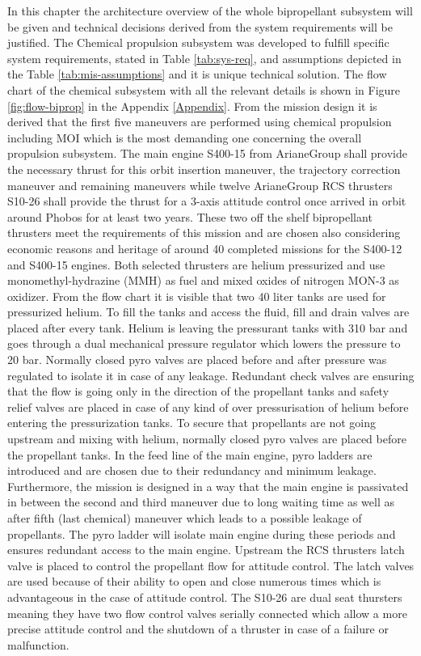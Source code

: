 \documentclass[conference]{IEEEtran}
\begin{document}
In this chapter the architecture overview of the whole bipropellant subsystem will be given and technical decisions derived from the system requirements will be justified.
The Chemical propulsion subsystem was developed to fulfill specific system requirements, stated in Table \ref{tab:sys-req}, and assumptions depicted in the Table \ref{tab:mis-assumptions} and it is unique technical solution. The flow chart of the chemical subsystem with all the relevant details is shown in Figure \ref{fig:flow-biprop} in the Appendix \ref{Appendix}. From the mission design it is derived that the first five maneuvers are performed using chemical propulsion including MOI which is the most demanding one concerning the overall propulsion subsystem. The main engine S400-15 from ArianeGroup shall provide the necessary thrust for this orbit insertion maneuver, the trajectory correction maneuver and remaining maneuvers while twelve ArianeGroup RCS thrusters S10-26 shall provide the thrust for a 3-axis attitude control once arrived in orbit around Phobos for at least two years. These two off the shelf bipropellant thrusters meet the requirements of this mission and are chosen also considering economic reasons and heritage of around 40 completed missions for the S400-12 and S400-15 engines. Both selected thrusters are helium pressurized and use monomethyl-hydrazine (MMH) as fuel and  mixed oxides of nitrogen MON-3 as oxidizer. From the flow chart it is visible that two 40 liter tanks are used for pressurized helium. To fill the tanks and access the fluid, fill and drain valves are placed after every tank. Helium is leaving the pressurant tanks with 310 bar and goes through a dual mechanical pressure regulator which lowers the pressure to 20 bar. Normally closed pyro valves are placed before and after pressure was regulated to isolate it in case of any leakage. Redundant check valves are ensuring that the flow is going only in the direction of the propellant tanks and safety relief valves are placed in case of any kind of over pressurisation of helium before entering the pressurization tanks. To secure that propellants are not going upstream and mixing with helium, normally closed pyro valves are placed before the propellant tanks. In the feed line of the main engine, pyro ladders are introduced and are chosen due to their redundancy and minimum leakage. Furthermore, the mission is designed in a way that the main engine is passivated in between the second and third maneuver due to long waiting time as well as after fifth (last chemical) maneuver which leads to a possible leakage of propellants. The pyro ladder will isolate main engine during these periods and ensures redundant access to the main engine. Upstream the RCS thrusters latch valve is placed to control the propellant flow for attitude control. The latch valves are used because of their ability to open and close numerous times which is advantageous in the case of attitude control. The S10-26 are dual seat thursters meaning they have two flow control valves serially connected which allow a more precise attitude control and the shutdown of a thruster in case of a failure or malfunction.
\end{document}
